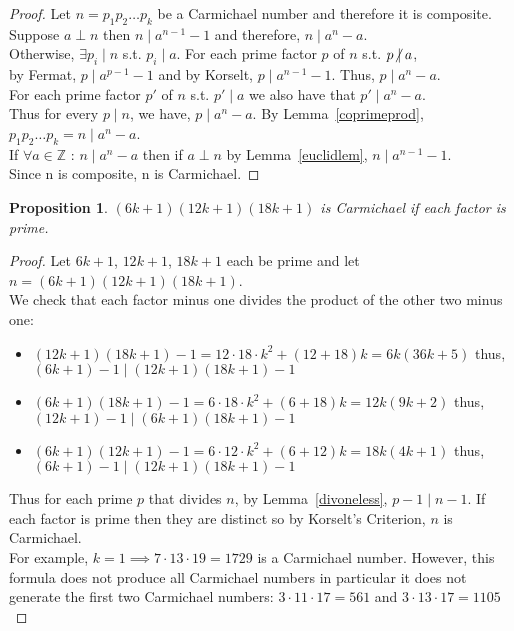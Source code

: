 \documentclass[12pt]{extarticle}
\renewcommand\qedsymbol{$\square$}
\newcommand{\divides}{\mid}
\newcommand{\ndivides}{\centernot \mid}
\newcommand{\Z}{\mathbb{Z}}
\newtheorem{proposition}[theorem]{Proposition}
\newenvironment{lproof}{\begin{proof} \renewcommand{\qedsymbol}{}}{\end{proof}}
\begin{document}
\begin{lproof}
Let $n = p_1   p_2   \dots   p_k$ be a Carmichael number and therefore it is composite. Suppose $a \perp n$ then $n \divides a^{n-1} - 1$ and therefore, $n \divides a^{n} - a$.\\
Otherwise, $\exists p_i \divides n$ s.t. $p_i \divides a$. For each prime factor $p$ of $n$ s.t. $p \ndivides a$,\\ by Fermat, $p \divides a^{p-1} - 1$ and by Korselt, $p \divides a^{n-1} - 1$. Thus, $p \divides a^{n} - a$. \\
For each prime factor $p'$ of $n$ s.t. $p' \divides a$ we also have that $p' \divides a^n - a$. \\
Thus for every $p \divides n$, we have, $p \divides a^n - a$. By Lemma~\ref{coprimeprod}, $p_1   p_2   \dots   p_k = n \divides a^n - a$.\\

\noindent If $\forall a \in \Z$ : $n \divides a^n - a$ then if $a \perp n$ by Lemma~\ref{euclidlem}, $n \divides a^{n-1} - 1$.\\ Since n is composite, n is Carmichael.    
\end{lproof}

\begin{proposition}
$(6k+1)(12k+1)(18k+1)$ is Carmichael if each factor is prime.
\end{proposition}

\begin{lproof}
Let $6k+1$, $12k + 1$, $18k + 1$ each be prime and let $n = (6k+1)(12k+1)(18k+1)$. \\
We check that each factor minus one divides the product of the other two minus one:
\begin{itemize}

\item $(12k+1)(18k+1) - 1 = 12 \cdot 18  \cdot k^2 + (12 + 18) k = 6k(36k + 5)$ thus, \\ $(6k+1) - 1 \divides (12k+1)(18k+1) - 1$

\item $(6k+1)(18k+1) - 1 = 6 \cdot 18  \cdot k^2 + (6 + 18) k = 12k(9k + 2)$ thus, \\ $(12k+1) - 1 \divides (6k+1)(18k+1) - 1$

\item $(6k+1)(12k+1) - 1 = 6 \cdot 12  \cdot k^2 + (6 + 12) k = 18k(4k + 1)$ thus, \\ $(6k+1) - 1 \divides (12k+1)(18k+1) - 1$
\end{itemize}

\noindent Thus for each prime $p$ that divides $n$, by Lemma~\ref{divoneless}, $p - 1 \divides n - 1$. If each factor is prime then they are distinct so by Korselt's Criterion, $n$ is Carmichael. \\ For example, $k = 1 \implies 7 \cdot 13 \cdot 19 = 1729$ is a Carmichael number. However, this formula does not produce all Carmichael numbers in particular it does not generate the first two Carmichael numbers: $3 \cdot 11 \cdot 17 = 561$ and $3 \cdot 13 \cdot 17 = 1105$
\end{lproof}
\end{document}
